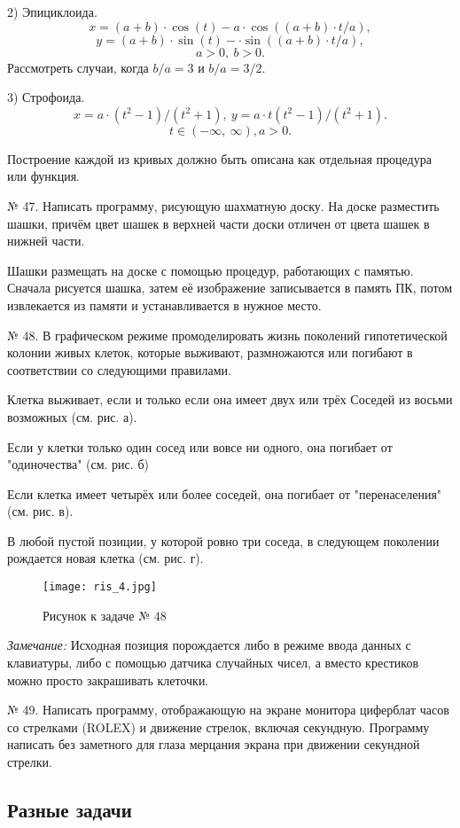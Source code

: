 {2) Эпициклоида.\\
$$x = (a + b)\cdot\cos(t) - a\cdot\cos((a + b)\cdot t / a),$$
$$y = (a + b)\cdot\sin(t) - \cdot\sin((a + b)\cdot t / a), $$
$$a > 0,\: b > 0.$$
Рассмотреть случаи, когда $b / a = 3$ и $b / a = 3 / 2.$

3) Строфоида.\\
$$x = a\cdot(t^2 -1)/(t^2 + 1), \:y = a\cdot t(t^2-1) / (t^2 +1).$$
$$ t \in (-\infty ,\:\infty),  a > 0.$$

Построение каждой из кривых должно быть описана как отдельная процедура или функция.


№ 47. Написать программу, рисующую шахматную доску. На доске разместить шашки, причём цвет шашек в верхней части доски отличен от цвета шашек в нижней части.

Шашки размещать на доске с помощью процедур, работающих с памятью. Сначала рисуется шашка, затем её изображение записывается в память ПК, потом извлекается из памяти и устанав­ливается в нужное место.

№ 48. В графическом режиме промоделировать жизнь поко­лений гипотетической колонии живых клеток, которые выживают, размножаются или погибают в соответствии со следующими прави­лами.

Клетка выживает, если и только если она имеет двух или трёх Соседей из восьми возможных (см. рис. а).
 
Если у клетки только один сосед или вовсе ни одного, она поги­бает от "одиночества" (см. рис. б)

Если клетка имеет четырёх или более соседей, она погибает от "перенаселения" (см. рис. в).

В любой пустой позиции, у которой ровно три соседа, в следу­ющем поколении рождается новая клетка (см. рис. г).
\begin{figure}[!hb]
\centerline{
\texttt{[image: ris\_4.jpg]}}
\caption{Рисунок к задаче № 48}
\end{figure}

{\it Замечание:} Исходная позиция порождается либо в режиме вво­да данных с клавиатуры, либо с помощью датчика случайных чисел, а вместо крестиков можно просто закрашивать клеточки.

№ 49. Написать программу, отображающую на экране монитора циферблат часов со стрелками (ROLEX) и движение стрелок, включая секундную. Программу написать без заметного для глаза мерцания экрана при движении секундной стрелки.

\subsection{Разные задачи}

}
